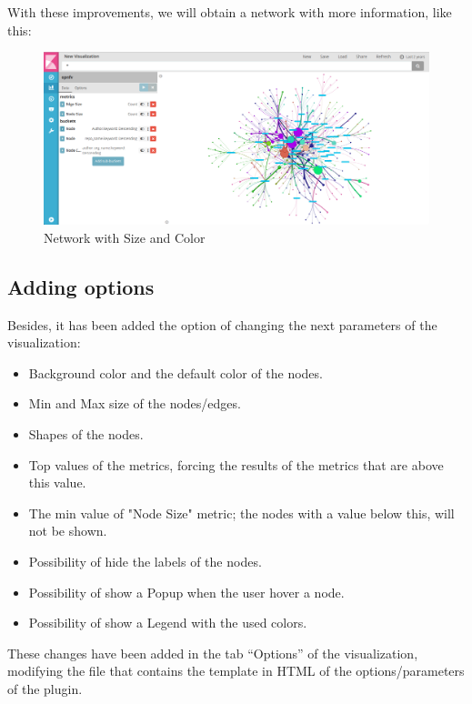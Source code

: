 \documentclass[a4paper, 12pt]{book}
\begin{document}
With these improvements, we will obtain a network with more information, like this:
 
\begin{figure}[H]
  \centering
  \includegraphics[width=16cm, keepaspectratio]{img/development/sizecolornetwork}
  \caption{Network with Size and Color}
  \label{fig:sizecolornetwork}
\end{figure}

\subsection{Adding options}

Besides, it has been added the option of changing the next parameters of the visualization:

\begin{itemize}
\item Background color and the default color of the nodes.
\item Min and Max size of the nodes/edges.
\item Shapes of the nodes.
\item Top values of the metrics, forcing the results of the metrics that are above this value.
\item The min value of "Node Size" metric; the nodes with a value below this, will not be shown.
\item Possibility of hide the labels of the nodes.
\item Possibility of show a Popup when the user hover a node.
\item Possibility of show a Legend with the used colors.
\end{itemize}

These changes have been added in the tab “Options” of the visualization, modifying the file that contains the template in HTML of the options/parameters of the plugin.
\end{document}
